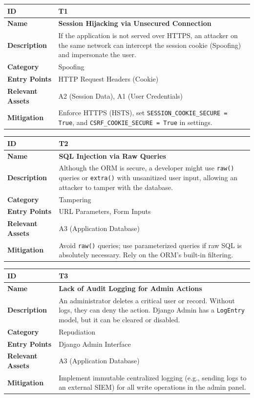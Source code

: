 \documentclass[10pt,a4paper]{article}
\begin{document}
\begin{longtable}{|p{3cm}|p{12cm}|}
\hline
\textbf{ID} & \textbf{T1} \\
\hline
\textbf{Name} & \textbf{Session Hijacking via Unsecured Connection} \\
\hline
\textbf{Description} & If the application is not served over HTTPS, an attacker on the same network can intercept the session cookie (Spoofing) and impersonate the user. \\
\hline
\textbf{Category} & Spoofing \\
\hline
\textbf{Entry Points} & HTTP Request Headers (Cookie) \\
\hline
\textbf{Relevant Assets} & A2 (Session Data), A1 (User Credentials) \\
\hline
\textbf{Mitigation} & Enforce HTTPS (HSTS), set \texttt{SESSION\_COOKIE\_SECURE = True}, and \texttt{CSRF\_COOKIE\_SECURE = True} in settings. \\
\hline
\end{longtable}

\begin{longtable}{|p{3cm}|p{12cm}|}
\hline
\textbf{ID} & \textbf{T2} \\
\hline
\textbf{Name} & \textbf{SQL Injection via Raw Queries} \\
\hline
\textbf{Description} & Although the ORM is secure, a developer might use \texttt{raw()} queries or \texttt{extra()} with unsanitized user input, allowing an attacker to tamper with the database. \\
\hline
\textbf{Category} & Tampering \\
\hline
\textbf{Entry Points} & URL Parameters, Form Inputs \\
\hline
\textbf{Relevant Assets} & A3 (Application Database) \\
\hline
\textbf{Mitigation} & Avoid \texttt{raw()} queries; use parameterized queries if raw SQL is absolutely necessary. Rely on the ORM's built-in filtering. \\
\hline
\end{longtable}

\begin{longtable}{|p{3cm}|p{12cm}|}
\hline
\textbf{ID} & \textbf{T3} \\
\hline
\textbf{Name} & \textbf{Lack of Audit Logging for Admin Actions} \\
\hline
\textbf{Description} & An administrator deletes a critical user or record. Without logs, they can deny the action. Django Admin has a \texttt{LogEntry} model, but it can be cleared or disabled. \\
\hline
\textbf{Category} & Repudiation \\
\hline
\textbf{Entry Points} & Django Admin Interface \\
\hline
\textbf{Relevant Assets} & A3 (Application Database) \\
\hline
\textbf{Mitigation} & Implement immutable centralized logging (e.g., sending logs to an external SIEM) for all write operations in the admin panel. \\
\hline
\end{longtable}
\end{document}
